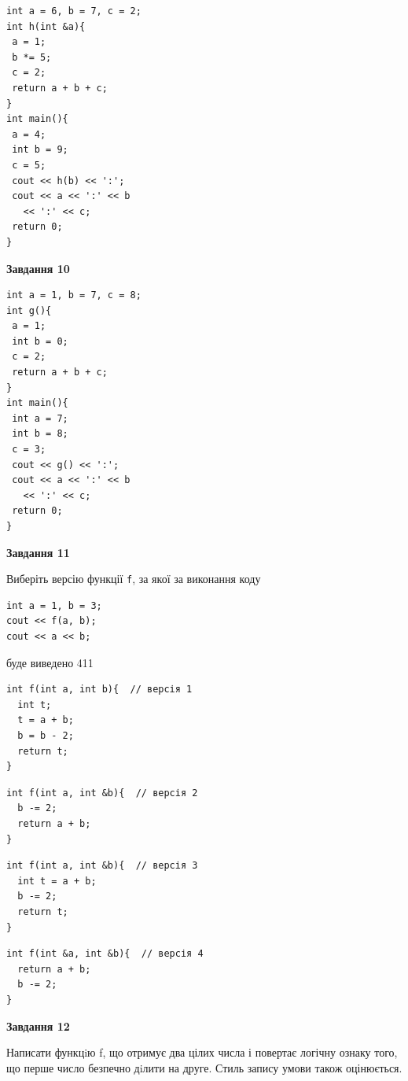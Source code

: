 \documentclass[12pt, ukrainian]{article}
\def\code#1{\Verb!#1!}
\begin{document}
{\begin {large}
\begin{minipage}[t]{7.0cm}
\begin{verbatim}
int a = 6, b = 7, c = 2;
int h(int &a){
 a = 1;
 b *= 5;
 c = 2;
 return a + b + c;
}
int main(){
 a = 4;
 int b = 9;
 c = 5;
 cout << h(b) << ':';
 cout << a << ':' << b 
   << ':' << c;
 return 0;
}
\end{verbatim}



\begin{center}
\textbf{Завдання 10}
\end{center}
\vspace{-8mm}

\begin{verbatim}
int a = 1, b = 7, c = 8;
int g(){
 a = 1;
 int b = 0;
 c = 2;
 return a + b + c;
}
int main(){
 int a = 7;
 int b = 8;
 c = 3;
 cout << g() << ':';
 cout << a << ':' << b 
   << ':' << c;
 return 0;
}
\end{verbatim}

\end{minipage}
\vline \hspace{1mm}
\begin{minipage}[t]{11.0cm}

\begin{center}
\textbf{Завдання 11}
\end{center}
Виберіть версію функції \code{f}, за якої за виконання коду
\begin{verbatim}
int a = 1, b = 3;
cout << f(a, b);
cout << a << b;
\end{verbatim}

буде виведено 411

\begin{verbatim}
int f(int a, int b){  // версія 1
  int t;
  t = a + b;
  b = b - 2;
  return t;
}
\end{verbatim}

\vspace{-8mm}\begin{verbatim}
int f(int a, int &b){  // версія 2
  b -= 2;
  return a + b;
}
\end{verbatim}

\vspace{-8mm}\begin{verbatim}
int f(int a, int &b){  // версія 3
  int t = a + b;
  b -= 2;
  return t;
}
\end{verbatim}

\vspace{-8mm}\begin{verbatim}
int f(int &a, int &b){  // версія 4
  return a + b;
  b -= 2;
}
\end{verbatim}



\begin{center}
\textbf{Завдання 12}
\end{center}

Написати функцiю f, що отримує два цілих числа і повертає логічну ознаку того, що перше число безпечно дiлити на друге. Стиль запису умови також оцінюється.\par

\end{minipage}

\end {large}}
\end{document}
